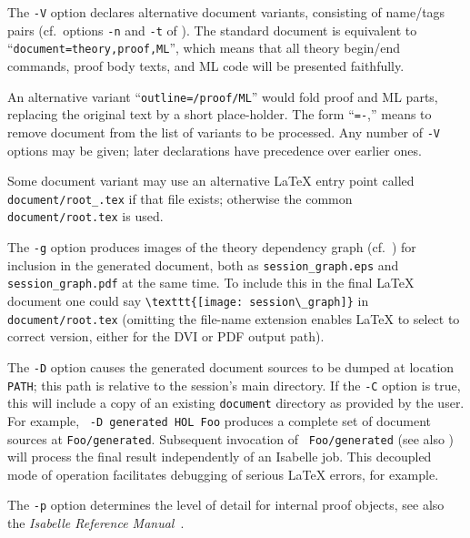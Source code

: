 \begin{isabellebody}
\begin{isamarkuptext}
  \medskip The \verb|-V| option declares alternative document
  variants, consisting of name/tags pairs (cf.\ options \verb|-n| and \verb|-t| of \hyperlink{tool.document}{\mbox{}}).  The standard
  document is equivalent to ``\verb|document=theory,proof,ML|'', which means that all theory begin/end
  commands, proof body texts, and ML code will be presented
  faithfully.

  An alternative variant ``\verb|outline=/proof/ML|'' would
  fold proof and ML parts, replacing the original text by a short
  place-holder.  The form ``\verb|=-|,'' means to
  remove document  from the list of variants to be
  processed.  Any number of \verb|-V| options may be given;
  later declarations have precedence over earlier ones.

  Some document variant  may use an alternative {\LaTeX}
  entry point called \verb|document/root_|\verb|.tex| if that file exists; otherwise the common
  \verb|document/root.tex| is used.

  \medskip The \verb|-g| option produces images of the theory
  dependency graph (cf.\ ) for inclusion in the
  generated document, both as \verb|session_graph.eps| and
  \verb|session_graph.pdf| at the same time.  To include this in
  the final {\LaTeX} document one could say \verb|\texttt{[image: session\_graph]}| in \verb|document/root.tex| (omitting the file-name extension enables
  {\LaTeX} to select to correct version, either for the DVI or PDF
  output path).

  \medskip The \verb|-D| option causes the generated document
  sources to be dumped at location \verb|PATH|; this path is
  relative to the session's main directory.  If the \verb|-C|
  option is true, this will include a copy of an existing \verb|document| directory as provided by the user.  For example, \hyperlink{tool.usedir}{\mbox{}}~\verb|-D generated HOL Foo| produces a complete set
  of document sources at \verb|Foo/generated|.  Subsequent
  invocation of \hyperlink{tool.document}{\mbox{}}~\verb|Foo/generated| (see also
  ) will process the final result
  independently of an Isabelle job.  This decoupled mode of operation
  facilitates debugging of serious {\LaTeX} errors, for example.

  \medskip The \verb|-p| option determines the level of detail
  for internal proof objects, see also the \emph{Isabelle Reference
  Manual}~\cite{isabelle-ref}.


\end{isamarkuptext}
\end{isabellebody}
